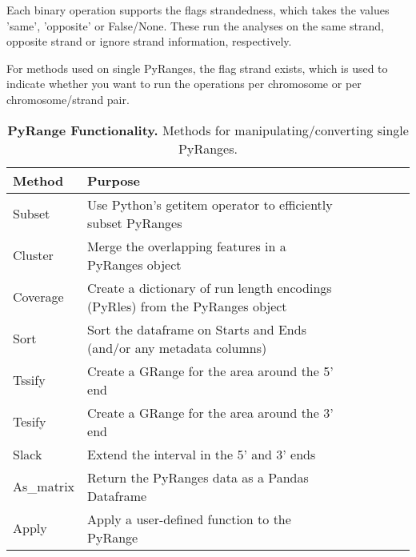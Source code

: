 \documentclass[10pt,letterpaper]{article}
\begin{document}
Each binary operation supports the flags strandedness, which takes the values
'same', 'opposite' or False/None. These run the analyses on the same strand,
opposite strand or ignore strand information, respectively.

For methods used on single PyRanges, the flag strand exists, which is used to
indicate whether you want to run the operations per chromosome or per
chromosome/strand pair.

\begin{table}[!ht]
\begin{adjustwidth}{-1.5in}{0in}
\centering
\caption{{\bf PyRange Functionality.} Methods for manipulating/converting single PyRanges.}
\begin{tabular}{|l|l|l|l|l|l|l|}
\hline
  {\bf Method} & {\bf Purpose} \\ \hline
  Subset & Use Python's getitem operator to efficiently subset PyRanges \\ \hline
  Cluster & Merge the overlapping features in a PyRanges object \\ \hline
  Coverage & Create a dictionary of run length encodings (PyRles) from the PyRanges object \\ \hline
  Sort & Sort the dataframe on Starts and Ends (and/or any metadata columns) \\ \hline
  Tssify & Create a GRange for the area around the 5' end \\ \hline
  Tesify & Create a GRange for the area around the 3' end \\ \hline
  Slack & Extend the interval in the 5' and 3' ends \\ \hline
  As\_matrix & Return the PyRanges data as a Pandas Dataframe \\ \hline
  Apply & Apply a user-defined function to the PyRange \\ \hline
\end{tabular}
\label{tab1}
\end{adjustwidth}
\end{table}
\end{document}
